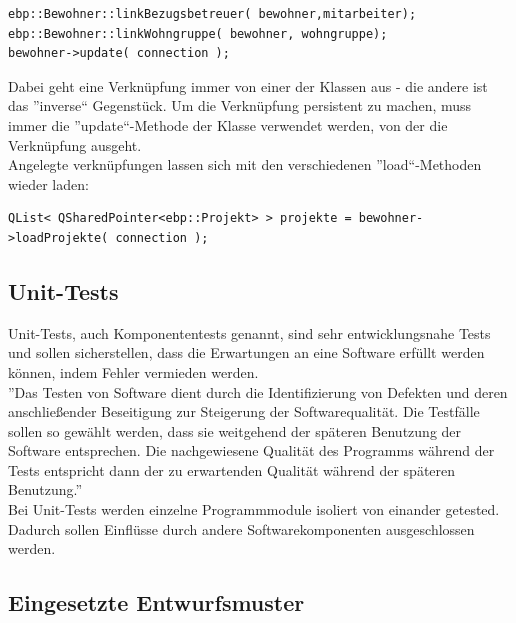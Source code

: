 \begin{lstlisting}
ebp::Bewohner::linkBezugsbetreuer( bewohner,mitarbeiter);
ebp::Bewohner::linkWohngruppe( bewohner, wohngruppe);
bewohner->update( connection );
\end{lstlisting}
Dabei geht eine Verknüpfung immer von einer der Klassen aus - die andere ist das ''inverse`` Gegenstück.
Um die Verknüpfung persistent zu machen, muss immer die ''update``-Methode der Klasse verwendet werden, von der die Verknüpfung ausgeht.\\
Angelegte verknüpfungen lassen sich mit den verschiedenen ''load``-Methoden wieder laden:\\
\begin{lstlisting}
QList< QSharedPointer<ebp::Projekt> > projekte = bewohner->loadProjekte( connection );
\end{lstlisting}

\newpage

\subsection{Unit-Tests}
Unit-Tests, auch Komponententests genannt, sind sehr entwicklungsnahe Tests und sollen sicherstellen, dass die Erwartungen an eine Software
erfüllt werden können, indem Fehler vermieden werden.\\
''Das Testen von Software dient durch die Identifizierung von Defekten und deren anschließender Beseitigung zur Steigerung der Softwarequalität. Die
Testfälle sollen so gewählt werden, dass sie weitgehend der späteren Benutzung der Software entsprechen. Die nachgewiesene Qualität des Programms
während der Tests entspricht dann der zu erwartenden Qualität während der späteren Benutzung\cite[S. 11]{Softwaretests}.''\\
Bei Unit-Tests werden einzelne Programmmodule isoliert von einander getested. Dadurch sollen Einflüsse durch andere Softwarekomponenten
ausgeschlossen werden.

\newpage

\subsection{Eingesetzte Entwurfsmuster}
